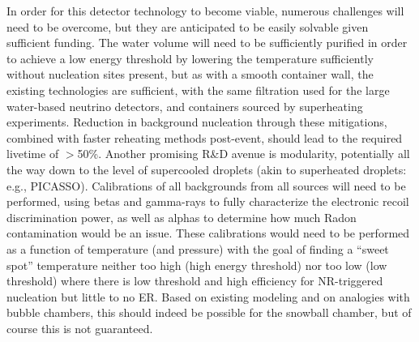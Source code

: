 In order for this detector technology to become viable, numerous challenges will need to be overcome, but they are anticipated to be easily solvable given sufficient funding. The water volume will need to be sufficiently purified in order to achieve a low energy threshold by lowering the temperature sufficiently without nucleation sites present, but as with a smooth container wall, the existing technologies are sufficient, with the same filtration used for the large water-based neutrino detectors, and containers sourced by superheating experiments. Reduction in background nucleation through these mitigations, combined with faster reheating methods post-event, should lead to the required livetime of $>$50\%. Another promising R\&D avenue is modularity, potentially all the way down to the level of supercooled droplets (akin to superheated droplets: e.g., PICASSO). Calibrations of all backgrounds from all sources will need to be performed, using betas and gamma-rays to fully characterize the electronic recoil discrimination power, as well as alphas to determine how much Radon contamination would be an issue. These calibrations would need to be performed as a function of temperature (and pressure) with the goal of finding a “sweet spot” temperature neither too high (high energy threshold) nor too low (low threshold) where there is low threshold and high efficiency for NR-triggered nucleation but little to no ER. Based on existing modeling and on analogies with bubble chambers, this should indeed be possible for the snowball chamber, but of course this is not guaranteed.

